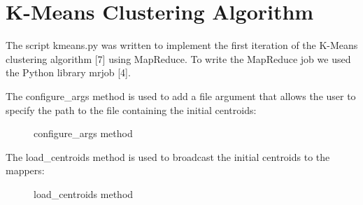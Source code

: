 \documentclass[11pt]{article}
\begin{document}
	\newpage
	\section{K-Means Clustering Algorithm}
	
The script kmeans.py was written to implement the first iteration of the K-Means clustering algorithm [7] using MapReduce. To write the MapReduce job we used the Python library mrjob [4].

The configure\_args method is used to add a file argument that allows the user to specify the path to the file containing the initial centroids:

\begin{figure}[H]
		\caption{configure\_args method}
	\end{figure}

	The load\_centroids method is used to broadcast the initial centroids to the mappers:
	
	\begin{figure}[H]
		\caption{load\_centroids method}
	\end{figure}
\end{document}
